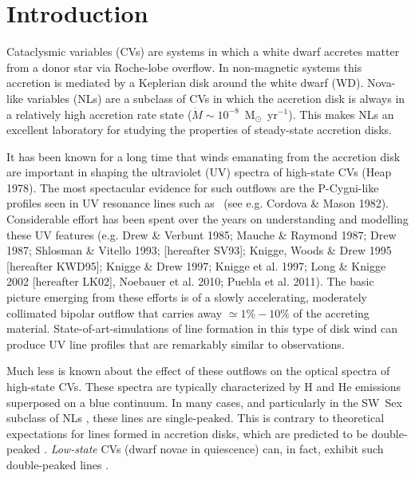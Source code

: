 \documentclass[preprint, a4paper, 11pt]{aastex}
\begin{document}
\maketitle


%
%

\section{Introduction} 
\label{sec:intro}

Cataclysmic variables (CVs) are systems in which a white dwarf
accretes matter from a donor star via Roche-lobe overflow. In
non-magnetic systems this accretion is mediated by a Keplerian disk
around the white dwarf (WD). Nova-like variables (NLs) are a subclass
of CVs in which the accretion disk is always in a relatively
high accretion rate state ($\dot{M} \sim
10^{-8}$~M$_{\odot}$~yr$^{-1}$).  This makes NLs an excellent
laboratory for studying the properties of steady-state accretion
disks.

It has been known for a long time that winds emanating from the
accretion disk are important in shaping the ultraviolet (UV) spectra
of high-state CVs (Heap 1978). The most spectacular evidence for such
outflows are the P-Cygni-like profiles seen in UV resonance lines such as
\civfull\ (see e.g. Cordova \& Mason
1982\nocite{cordova1982}). Considerable effort has been spent over the
years on understanding and modelling these UV features (e.g. Drew \&
Verbunt 1985\nocite{drewverbunt1985}; Mauche \& Raymond
1987\nocite{maucheraymond1987}; Drew 1987; Shlosman \& Vitello 1993; [hereafter
SV93]\nocite{SV93}; Knigge, Woods \& Drew 1995 [hereafter
KWD95]\nocite{KWD95}; Knigge \& Drew 1997\nocite{kd1997}; 
Knigge et al. 1997\nocite{knigge1997}; Long \&
Knigge 2002 [hereafter LK02]\nocite{LK02}, Noebauer et al. 2010\nocite{noebauer};
Puebla et al. 2011\nocite{puebla2011}). The basic picture emerging from these efforts is
of a slowly accelerating, moderately collimated bipolar
outflow that carries away $\simeq 1\% - 10\%$ of the accreting
material. State-of-art-simulations of line formation in this type
of disk wind can produce UV line profiles that are remarkably similar
to observations.

Much less is known about the effect of these outflows on the optical
spectra of high-state CVs. These spectra are typically characterized
by H and He emissions superposed on a blue continuum. In many
cases, and particularly in the SW~Sex subclass of NLs
\citep{HSK86,DR95}, these lines are single-peaked. This is contrary to
theoretical expectations for lines formed in accretion disks, which
are predicted to be double-peaked \citep{smak1981, hornemarsh1986}. 
{\em Low-state} CVs (dwarf novae in quiescence) can, in fact,
exhibit such double-peaked lines \citep{marshhorne1990}. 
\end{document}
